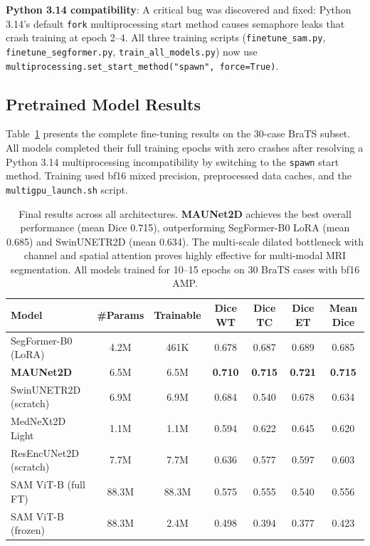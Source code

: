 \documentclass[11pt,a4paper]{article}
\begin{document}
\textbf{Python 3.14 compatibility}: A critical bug was discovered and fixed: Python 3.14's default \texttt{fork} multiprocessing start method causes semaphore leaks that crash training at epoch 2–4. All three training scripts (\texttt{finetune\_sam.py}, \texttt{finetune\_segformer.py}, \texttt{train\_all\_models.py}) now use \texttt{multiprocessing.set\_start\_method("spawn", force=True)}.

\subsection{Pretrained Model Results}

Table~\ref{tab:pretrained_results} presents the complete fine-tuning results on the 30-case BraTS subset. All models completed their full training epochs with zero crashes after resolving a Python 3.14 multiprocessing incompatibility by switching to the \texttt{spawn} start method. Training used bf16 mixed precision, preprocessed data caches, and the \texttt{multigpu\_launch.sh} script.

\begin{table}[H]
\centering
\begin{tabular}{lcccccc}
\toprule
\textbf{Model} & \textbf{\#Params} & \textbf{Trainable} & \textbf{Dice WT} & \textbf{Dice TC} & \textbf{Dice ET} & \textbf{Mean Dice} \\
\midrule
SegFormer-B0 (LoRA)    & 4.2M  & 461K  & 0.678 & 0.687 & 0.689 & 0.685 \\
\textbf{MAUNet2D}          & 6.5M  & 6.5M  & \textbf{0.710} & \textbf{0.715} & \textbf{0.721} & \textbf{0.715} \\
SwinUNETR2D (scratch)  & 6.9M  & 6.9M  & 0.684 & 0.540 & 0.678 & 0.634 \\
MedNeXt2D Light        & 1.1M  & 1.1M  & 0.594 & 0.622 & 0.645 & 0.620 \\
ResEncUNet2D (scratch) & 7.7M  & 7.7M  & 0.636 & 0.577 & 0.597 & 0.603 \\
SAM ViT-B (full FT)    & 88.3M & 88.3M & 0.575 & 0.555 & 0.540 & 0.556 \\
SAM ViT-B (frozen)     & 88.3M & 2.4M  & 0.498 & 0.394 & 0.377 & 0.423 \\
\bottomrule
\end{tabular}
\caption{Final results across all architectures. \textbf{MAUNet2D} achieves the best overall performance (mean Dice 0.715), outperforming SegFormer-B0 LoRA (mean 0.685) and SwinUNETR2D (mean 0.634). The multi-scale dilated bottleneck with channel and spatial attention proves highly effective for multi-modal MRI segmentation. All models trained for 10–15 epochs on 30 BraTS cases with bf16 AMP.}
\label{tab:pretrained_results}
\end{table}
\end{document}
